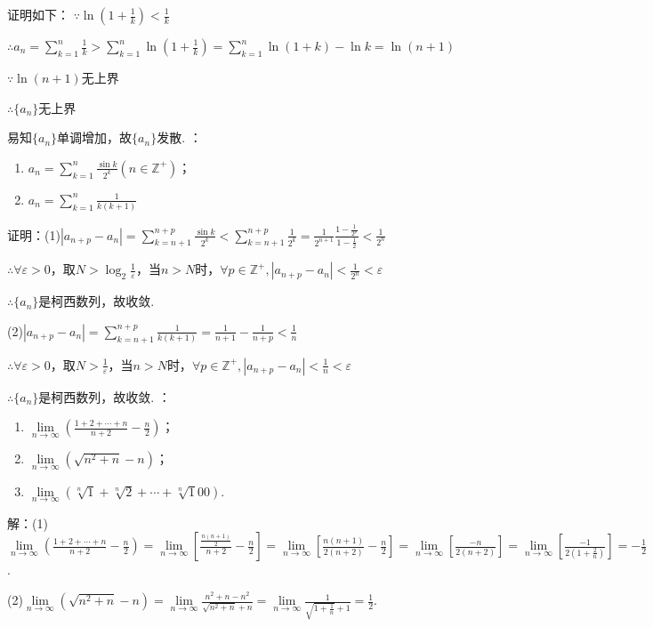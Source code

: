 \documentclass[12pt,UTF8]{ctexart}
\begin{document}
\begin{enumerate}
证明如下：
$\because\ln(1+\frac1k)<\frac1k$

$\therefore a_n=\sum_{k=1}^{n}\frac1k>\sum_{k=1}^{n}\ln(1+\frac1k)=\sum_{k=1}^{n}\ln(1+k)-\ln k=\ln(n+1)$

$\because\ln(n+1)$无上界

$\therefore\{a_n\}$无上界

易知$\{a_n\}$单调增加，故$\{a_n\}$发散.
：
\begin{enumerate}[(1)]
	\item$a_n=\sum_{k=1}^n\frac{\sin k}{2^k}(n\in\mathbb Z^+)$；
	\item$a_n=\sum_{k=1}^{n}\frac1{k(k+1)}$
\end{enumerate}
证明：(1)$|a_{n+p}-a_n|=\sum_{k=n+1}^{n+p}\frac{\sin k}{2^k}<\sum_{k=n+1}^{n+p}\frac1{2^k}=\frac1{2^{n+1}}\frac{1-\frac1{2^p}}{1-\frac12}<\frac1{2^n}$

$\therefore\forall\varepsilon>0$，取$N>\log_2\frac1\varepsilon$，当$n>N$时，$\forall p\in\mathbb Z^+,|a_{n+p}-a_n|<\frac1{2^n}<\varepsilon$

$\therefore\{a_n\}$是柯西数列，故收敛.

(2)$|a_{n+p}-a_n|=\sum_{k=n+1}^{n+p}\frac1{k(k+1)}=\frac1{n+1}-\frac1{n+p}<\frac1n$

$\therefore\forall\varepsilon>0$，取$N>\frac1\varepsilon$，当$n>N$时，$\forall p\in\mathbb Z^+,|a_{n+p}-a_n|<\frac1{n}<\varepsilon$

$\therefore\{a_n\}$是柯西数列，故收敛.
：
\begin{enumerate}[(1)]
	\item$\lim\limits_{n\rightarrow\infty}(\frac{1+2+\cdots+n}{n+2}-\frac n2)$；
	\item$\lim\limits_{n\rightarrow\infty}(\sqrt{n^2+n}-n)$；
	\item$\lim\limits_{n\rightarrow\infty}(\sqrt[n]1+\sqrt[n]2+\cdots+\sqrt[n]100)$.
\end{enumerate}
解：(1)$\lim\limits_{n\rightarrow\infty}(\frac{1+2+\cdots+n}{n+2}-\frac n2)=\lim\limits_{n\rightarrow\infty}[\frac{\frac{n(n+1)}2}{n+2}-\frac n2]=\lim\limits_{n\rightarrow\infty}[\frac{n(n+1)}{2(n+2)}-\frac n2]=\lim\limits_{n\rightarrow\infty}[\frac{-n}{2(n+2)}]=\lim\limits_{n\rightarrow\infty}[\frac{-1}{2(1+\frac2n)}]=-\frac12$.

(2)$\lim\limits_{n\rightarrow\infty}(\sqrt{n^2+n}-n)=\lim\limits_{n\rightarrow\infty}\frac{n^2+n-n^2}{\sqrt{n^2+n}+n}=\lim\limits_{n\rightarrow\infty}\frac{1}{\sqrt{1+\frac1n}+1}=\frac12$.


\end{enumerate}
\end{document}

